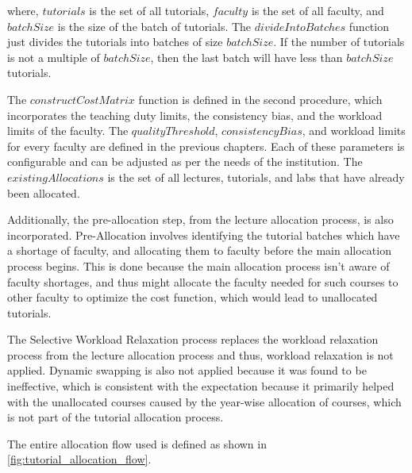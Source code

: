 where, $tutorials$ is the set of all tutorials, $faculty$ is the set of all faculty, and $batchSize$ is the size of the batch of tutorials. The $divideIntoBatches$ function just divides the tutorials into batches of size $batchSize$. If the number of tutorials is not a multiple of $batchSize$, then the last batch will have less than $batchSize$ tutorials.

The $constructCostMatrix$ function is defined in the second procedure, which incorporates the teaching duty limits, the consistency bias, and the workload limits of the faculty. The $qualityThreshold$, $consistencyBias$, and workload limits for every faculty are defined in the previous chapters. Each of these parameters is configurable and can be adjusted as per the needs of the institution. The $existingAllocations$ is the set of all lectures, tutorials, and labs that have already been allocated.

Additionally, the pre-allocation step, from the lecture allocation process, is also incorporated. Pre-Allocation involves identifying the tutorial batches which have a shortage of faculty, and allocating them to faculty before the main allocation process begins. This is done because the main allocation process isn't aware of faculty shortages, and thus might allocate the faculty needed for such courses to other faculty to optimize the cost function, which would lead to unallocated tutorials.

The Selective Workload Relaxation process replaces the workload relaxation process from the lecture allocation process and thus, workload relaxation is not applied. Dynamic swapping is also not applied because it was found to be ineffective, which is consistent with the expectation because it primarily helped with the unallocated courses caused by the year-wise allocation of courses, which is not part of the tutorial allocation process.

The entire allocation flow used is defined as shown in \autoref{fig:tutorial_allocation_flow}.


